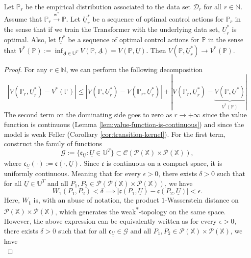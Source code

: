 \documentclass[11pt]{article}
\newcommand{\NN}{\mathbb{N}}
\newcommand{\XX}{\mathbb{X}}
\newcommand{\UU}{\mathbb{U}}
\newcommand{\PP}{\mathbb{P}}
\newcommand{\cC}{\mathcal{C}}
\newcommand{\cD}{\mathcal{D}}
\newcommand{\cG}{\mathcal{G}}
\newcommand{\cP}{\mathcal{P}}
\newcommand{\fc}{\mathfrak{c}}
\begin{document}
\begin{theorem}\label{thm:robustness}
    Let $\PP_r$ be the empirical distribution associated to the data set $\cD_r$ for all $r\in\NN$. Assume that $\PP_r \xrightarrow{\mathrm{w}^*} \PP$. Let $\underline{U}_r^*$ be a sequence of optimal control actions for $\PP_r$ in the sense that if we train the Transformer with the underlying data set, $\underline{U}_r^*$ is optimal. Also, let $\underline{U}^*$ be a sequence of optimal control actions for $\PP$ in the sense that $V^*(\PP) := \inf_{\underline{A}\in\UU^T}V(\PP, \underline{A}) = V(\PP, \underline{U})$. Then $V(\PP, \underline{U}_r^*) \to V^*(\PP)$.
\end{theorem}
\begin{proof}
    For any $r\in\NN$, we can perform the following decomposition
    \begin{equation*}
        |V(\PP_r, \underline{U}_r^*)-V^*(\PP)| \leq |V(\PP, \underline{U}_r^*) - V(\PP_r,\underline{U}_r^*)| + |V(\PP_r,\underline{U}_r^*) - \underbrace{V(\PP, \underline{U}^*)}_{V^*(\PP)}|
    \end{equation*} 
    The second term on the dominating side goes to zero as $r\to+\infty$ since the value function is continuous (Lemma \ref{lem:value-function-is-continuous}) and since the model is weak Feller (Corollary \ref{cor:transition-kernel}). For the first term, construct the family of functions 
    \begin{equation*}
        \cG := \{\fc_{\underline{U}} : \underline{U} \in \UU^T\} \subset \cC(\cP(\XX)\times\cP(\XX)),
    \end{equation*}
    where $\fc_{\underline{U}}(\cdot) := \fc(\cdot, \underline{U})$. Since $\fc$ is continuous on a compact space, it is uniformly continuous. Meaning that for every $\epsilon > 0$, there exists $\delta > 0$ such that for all $\underline{U} \in \UU^T$ and all $P_1,P_2\in\cP(\cP(\XX)\times\cP(\XX))$, we have
    \begin{equation*}
        W_1(P_1, P_2) < \delta \implies |\fc(P_1, \underline{U}) - \fc(P_2, \underline{U})| < \epsilon.
    \end{equation*}
    Here, $W_1$ is, with an abuse of notation, the product $1$-Wasserstein distance on $\cP(\XX)\times\cP(\XX)$, which generates the weak\textsuperscript{$*$}-topology on the same space. However, the above expression can be equivalently written as for every $\epsilon > 0$, there exists $\delta > 0$ such that for all $\fc_{\underline{U}}\in\cG$ and all $P_1,P_2\in\cP(\XX)\times\cP(\XX)$, we have
    \begin{equation*}

\end{equation*}
\end{proof}
\end{document}
